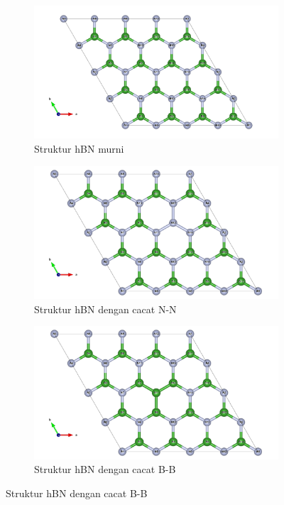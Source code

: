 \begin{figure}[H]
    \centering

    \begin{subfigure}{0.8\linewidth}
        \centering
        \includegraphics[width=\linewidth]{gambar_hasil/pure_hBN_4x4x1.png}
        \caption{Struktur hBN murni}
    \end{subfigure}
    \vspace{0.5cm} %

    \begin{subfigure}{0.8\linewidth}
        \centering
        \includegraphics[width=\linewidth]{gambar_hasil/NN_defect_hBN_center_4x4x1.png}
        \caption{Struktur hBN dengan cacat N-N}
    \end{subfigure}
    \vspace{0.5cm}

    \begin{subfigure}{0.8\linewidth}
        \centering
        \includegraphics[width=\linewidth]{gambar_hasil/BB_defect_hBN_center_4x4x1.png}
        \caption{Struktur hBN dengan cacat B-B}
    \end{subfigure}


\end{figure}

